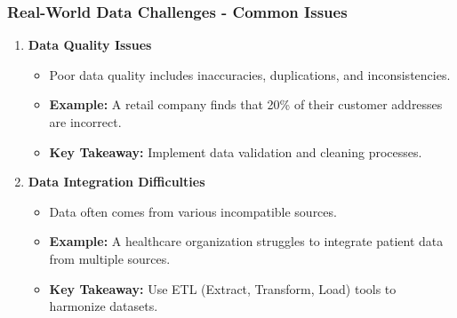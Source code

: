 \documentclass{beamer}
\begin{document}
\begin{frame}[fragile]
    \frametitle{Real-World Data Challenges - Common Issues}
    \begin{enumerate}
        \item \textbf{Data Quality Issues}
        \begin{itemize}
            \item Poor data quality includes inaccuracies, duplications, and inconsistencies.
            \item \textbf{Example:} A retail company finds that 20\% of their customer addresses are incorrect.
            \item \textbf{Key Takeaway:} Implement data validation and cleaning processes.
        \end{itemize}
        
        \item \textbf{Data Integration Difficulties}
        \begin{itemize}
            \item Data often comes from various incompatible sources.
            \item \textbf{Example:} A healthcare organization struggles to integrate patient data from multiple sources.
            \item \textbf{Key Takeaway:} Use ETL (Extract, Transform, Load) tools to harmonize datasets.
        \end{itemize}
    \end{enumerate}
\end{frame}
\end{document}

